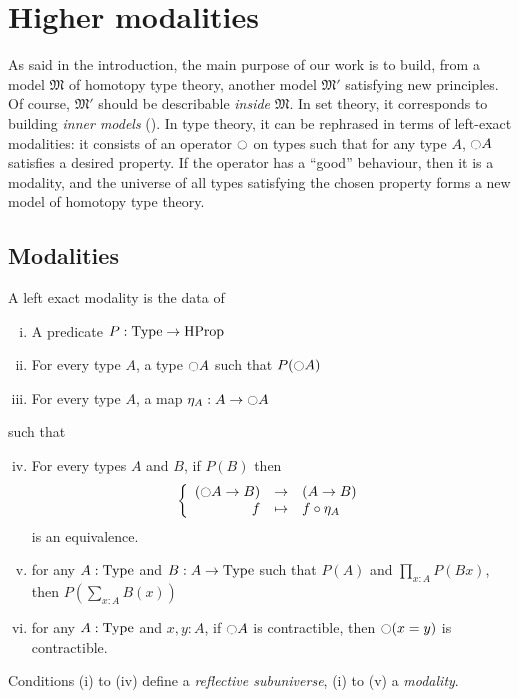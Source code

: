 \chapter{Higher modalities}
\label{chap:modalities}

As said in the introduction, the main purpose of our work is to build,
from a model $\mathfrak M$ of homotopy type theory, another model
$\mathfrak M'$ satisfying new principles. Of course, $\mathfrak M'$
should be describable {\em inside} $\mathfrak M$. In set theory, it
corresponds to building {\em inner models} (\cite{kunen}).%
%
In type theory, it can be rephrased in terms of left-exact modalities:
it consists of an operator $\ocircle$ on types such that for any type
$A$, $\ocircle A$ satisfies a desired property. If the operator has a
``good'' behaviour, then it is a modality, and the universe of all
types satisfying the chosen property forms a new model of homotopy
type theory.

\section{Modalities}
\label{sec:modalities}

\begin{defi}
  \label{def:modality}
  A left exact modality is the data of
  \begin{enumerate}[(i)]
  \item A predicate $P:\operatorname{Type} \to \operatorname{HProp}$
  \item For every type $A$, a type
    $\ocircle A$ such that $P(\ocircle A)$
  \item For every type $A$, a map $\eta_A:A \to
    \ocircle A$
  \end{enumerate}
  such that
  \begin{enumerate}[(i)]
    \setcounter{enumi}{3}
  \item For every types $A$ and $B$, if $P(B)$ then
    \[ \left\{
        \begin{array}{rcl}
          (\ocircle A \to B) & \to & (A \to B) \\
          f & \mapsto & f \circ \eta_A
        \end{array} \right. \] %
    is an equivalence.
  \item for any $A:\operatorname{Type}$ and $B:A \to \operatorname{Type}$ such that $P(A)$
    and $\prod_{x:A} P(B x)$, then $P\left( \sum_{x:A} B(x)\right)$
  \item for any $A:\operatorname{Type}$ and $x,y:A$, if $\ocircle A$ is
    contractible, then $\ocircle (x=y)$ is contractible.
  \end{enumerate}
  Conditions (i) to (iv) define a {\em reflective subuniverse}, (i) to
  (v) a {\em modality}.
\end{defi}

